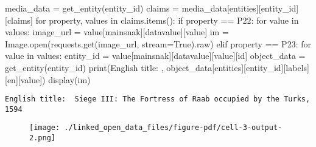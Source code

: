 \documentclass[
  letterpaper,
  DIV=11,
  numbers=noendperiod]{scrreprt}
\newenvironment{Shaded}{\begin{snugshade}}{\end{snugshade}}
\newcommand{\BuiltInTok}[1]{\textcolor[rgb]{0.00,0.23,0.31}{#1}}
\newcommand{\ControlFlowTok}[1]{\textcolor[rgb]{0.00,0.23,0.31}{#1}}
\newcommand{\KeywordTok}[1]{\textcolor[rgb]{0.00,0.23,0.31}{#1}}
\newcommand{\NormalTok}[1]{\textcolor[rgb]{0.00,0.23,0.31}{#1}}
\newcommand{\OperatorTok}[1]{\textcolor[rgb]{0.37,0.37,0.37}{#1}}
\newcommand{\StringTok}[1]{\textcolor[rgb]{0.13,0.47,0.30}{#1}}
\newcommand{\VariableTok}[1]{\textcolor[rgb]{0.07,0.07,0.07}{#1}}
\begin{document}
\begin{Shaded}
\begin{Highlighting}[]
\NormalTok{media\_data }\OperatorTok{=}\NormalTok{ get\_entity(entity\_id)}
\NormalTok{claims }\OperatorTok{=}\NormalTok{ media\_data[}\StringTok{\textquotesingle{}entities\textquotesingle{}}\NormalTok{][entity\_id][}\StringTok{\textquotesingle{}claims\textquotesingle{}}\NormalTok{]}
\ControlFlowTok{for} \BuiltInTok{property}\NormalTok{, values }\KeywordTok{in}\NormalTok{ claims.items():}
    \ControlFlowTok{if} \BuiltInTok{property} \OperatorTok{==} \StringTok{\textquotesingle{}P22\textquotesingle{}}\NormalTok{:}
        \ControlFlowTok{for}\NormalTok{ value }\KeywordTok{in}\NormalTok{ values:}
\NormalTok{            image\_url }\OperatorTok{=}\NormalTok{ value[}\StringTok{\textquotesingle{}mainsnak\textquotesingle{}}\NormalTok{][}\StringTok{\textquotesingle{}datavalue\textquotesingle{}}\NormalTok{][}\StringTok{\textquotesingle{}value\textquotesingle{}}\NormalTok{]}
\NormalTok{            im }\OperatorTok{=}\NormalTok{ Image.}\BuiltInTok{open}\NormalTok{(requests.get(image\_url, stream}\OperatorTok{=}\VariableTok{True}\NormalTok{).raw)}
    \ControlFlowTok{elif} \BuiltInTok{property} \OperatorTok{==} \StringTok{\textquotesingle{}P23\textquotesingle{}}\NormalTok{:}
        \ControlFlowTok{for}\NormalTok{ value }\KeywordTok{in}\NormalTok{ values:}
\NormalTok{            entity\_id }\OperatorTok{=}\NormalTok{ value[}\StringTok{\textquotesingle{}mainsnak\textquotesingle{}}\NormalTok{][}\StringTok{\textquotesingle{}datavalue\textquotesingle{}}\NormalTok{][}\StringTok{\textquotesingle{}value\textquotesingle{}}\NormalTok{][}\StringTok{\textquotesingle{}id\textquotesingle{}}\NormalTok{]}
\NormalTok{            object\_data }\OperatorTok{=}\NormalTok{ get\_entity(entity\_id)}
\BuiltInTok{print}\NormalTok{(}\StringTok{\textquotesingle{}English title: \textquotesingle{}}\NormalTok{, object\_data[}\StringTok{\textquotesingle{}entities\textquotesingle{}}\NormalTok{][entity\_id][}\StringTok{\textquotesingle{}labels\textquotesingle{}}\NormalTok{][}\StringTok{\textquotesingle{}en\textquotesingle{}}\NormalTok{][}\StringTok{\textquotesingle{}value\textquotesingle{}}\NormalTok{])}
\NormalTok{display(im)}
\end{Highlighting}
\end{Shaded}

\begin{verbatim}
English title:  Siege III: The Fortress of Raab occupied by the Turks, 1594
\end{verbatim}

\begin{figure}[H]

{\centering \texttt{[image: ./linked\_open\_data\_files/figure-pdf/cell-3-output-2.png]}

}

\end{figure}
\end{document}
